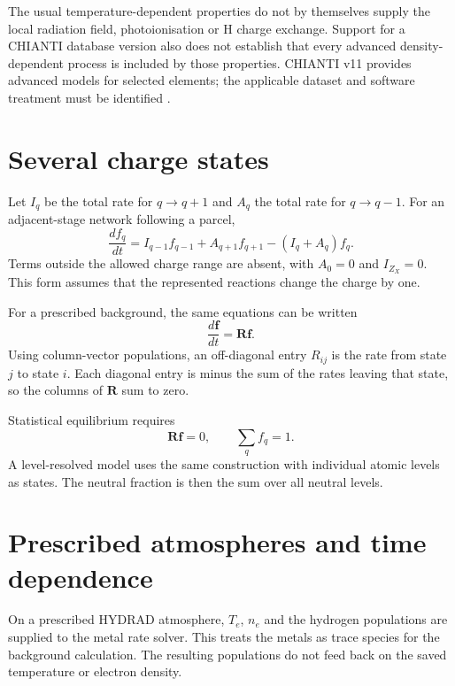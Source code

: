 \documentclass[a4paper,10pt,twoside,openany]{book}
\numberwithin{equation}{chapter}
\begin{document}
The usual temperature-dependent properties do not by themselves
supply the local radiation field, photoionisation or H charge
exchange. Support for a CHIANTI database version also does not
establish that every advanced density-dependent process is
included by those properties. CHIANTI v11 provides advanced
models for selected elements; the applicable dataset and
software treatment must be identified \cite{Dufresne2024}.

\section{Several charge states}
Let $I_q$ be the total rate for $q\rightarrow q+1$ and $A_q$
the total rate for $q\rightarrow q-1$. For an adjacent-stage
network following a parcel,
\begin{equation}
  \frac{df_q}{dt}
  =I_{q-1}f_{q-1}+A_{q+1}f_{q+1}
   -(I_q+A_q)f_q.
  \label{eq:multistage}
\end{equation}
Terms outside the allowed charge range are absent, with
$A_0=0$ and $I_{Z_X}=0$. This form assumes that the represented
reactions change the charge by one.

For a prescribed background, the same equations can be written
\begin{equation}
  \frac{d\boldsymbol f}{dt}=\boldsymbol R\boldsymbol f.
\end{equation}
Using column-vector populations, an off-diagonal entry $R_{ij}$
is the rate from state $j$ to state $i$. Each diagonal entry
is minus the sum of the rates leaving that state, so the
columns of $\boldsymbol R$ sum to zero.

Statistical equilibrium requires
\begin{equation}
  \boldsymbol R\boldsymbol f=0,\qquad \sum_q f_q=1.
\end{equation}
A level-resolved model uses the same construction with individual
atomic levels as states. The neutral fraction is then the sum
over all neutral levels.

\section{Prescribed atmospheres and time dependence}
On a prescribed HYDRAD atmosphere, $T_e$, $n_e$ and the hydrogen
populations are supplied to the metal rate solver. This treats
the metals as trace species for the background calculation.
The resulting populations do not feed back on the saved
temperature or electron density.
\end{document}
